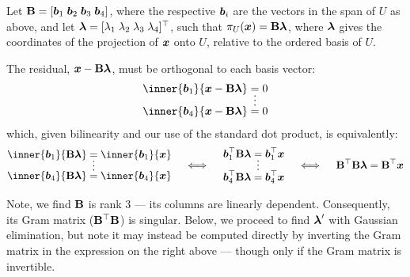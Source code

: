 \documentclass[11pt]{article}
\begin{document}
\begin{enumerate}
\begin{enumerate}
                    Let $\mathbf{B} = [ \boldsymbol{b}_1 \; \boldsymbol{b}_2 \; \boldsymbol{b}_3 \; \boldsymbol{b}_4  ]$, where the respective
                    $\boldsymbol{b}_i$ are the vectors in the span of $U$ as above, and let $\boldsymbol{\lambda} = [ \lambda_1 \;
                        \lambda_2 \; \lambda_3 \; \lambda_4 ]^\top$, such that $\pi_U(\boldsymbol{x}) = \mathbf{B}\boldsymbol{\lambda}$, where
                    $\boldsymbol{\lambda}$ gives the coordinates of the projection of $\boldsymbol{x}$ onto $U$, relative to the ordered
                    basis of $U$.

                    The residual, $\boldsymbol{x} - \mathbf{B} \boldsymbol{\lambda}$, must be orthogonal to each basis vector:
                    \[
                        \begin{aligned}
                            \inner{\vect{b}_1}{\x - \mat{B}\vect{\lambda}} & = 0 \\ & \shortvdotswithin{=}
                            \inner{\vect{b}_4}{\x - \mat{B}\vect{\lambda}} & = 0 \\
                        \end{aligned}
                    \]
                    which, given bilinearity and our use of the standard dot product, is equivalently:
                    \[
                        \begin{aligned}
                            \inner{\vect{b}_1}{\mat{B}\vect{\lambda}} & = \inner{\vect{b}_1}{\x} \\ & \shortvdotswithin{=}
                            \inner{\vect{b}_4}{\mat{B}\vect{\lambda}} & = \inner{\vect{b}_4}{\x} \\
                        \end{aligned}
                        \quad
                        \iff
                        \quad
                        \begin{aligned}
                            \vect{b}_1^\top \mat{B}\vect{\lambda} & = \vect{b}_1^\top \x \\ & \shortvdotswithin{=}
                            \vect{b}_4^\top \mat{B}\vect{\lambda} & = \vect{b}_4^\top \x \\
                        \end{aligned}
                        \quad
                        \iff
                        \quad
                        \mat{B}^\top \mat{B} \vect{\lambda} = \mat{B}^\top \x \\ [2pt]
                    \]

                    Note, we find $\mathbf{B}$ is rank 3 — its columns are linearly dependent.  Consequently, its Gram
                    matrix ($\mathbf{B}^\top \mathbf{B}$) is singular.  Below, we proceed to find $\boldsymbol{\lambda}'$ with
                    Gaussian elimination, but note it may instead be computed directly by inverting the Gram matrix in
                    the expression on the right above — though only if the Gram matrix is invertible.


\end{enumerate}
\end{enumerate}
\end{document}
